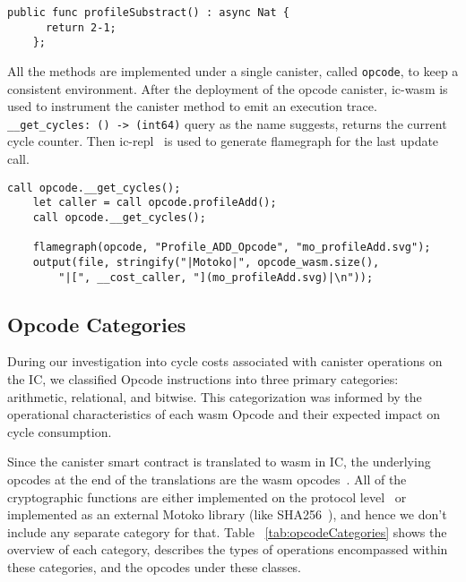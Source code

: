   \begin{lstlisting}[caption={Function to subtract two numbers}, label={lst:subtractFunc}]
    public func profileSubstract() : async Nat {
      return 2-1;
    };
  \end{lstlisting}

All the methods are implemented under a single canister, called \texttt{opcode}, to keep a consistent environment. After the deployment of the opcode canister, ic-wasm is used to instrument the canister method to emit an execution trace. \texttt{\_\_get\_cycles: () -> (int64)} query as the name suggests, returns the current cycle counter. Then ic-repl~\cite{icrepl} is used to generate flamegraph for the last update call. 

\begin{lstlisting}[caption={Function Call and Data Handling}, label={lst:functionCallData}]
    call opcode.__get_cycles();
    let caller = call opcode.profileAdd();
    call opcode.__get_cycles();
    
    flamegraph(opcode, "Profile_ADD_Opcode", "mo_profileAdd.svg");
    output(file, stringify("|Motoko|", opcode_wasm.size(), 
        "|[", __cost_caller, "](mo_profileAdd.svg)|\n"));
\end{lstlisting}
    

\subsection{Opcode Categories}
\label{sec:OpcodeCategories}
During our investigation into cycle costs associated with canister operations on the IC, we classified Opcode instructions into three primary categories: arithmetic, relational, and bitwise. This categorization was informed by the operational characteristics of each wasm Opcode and their expected impact on cycle consumption.

Since the canister smart contract is translated to wasm in IC, the underlying opcodes at the end of the translations are the wasm opcodes~\cite{wasm-ops}. All of the cryptographic functions are either implemented on the protocol level~\cite{Chain-key-cryptographys} or implemented as an external Motoko library (like SHA256~\cite{sha256}), and hence we don’t include any separate category for that. Table ~\ref{tab:opcodeCategories} shows the overview of each category, describes the types of operations encompassed within these categories, and the opcodes under these classes.

